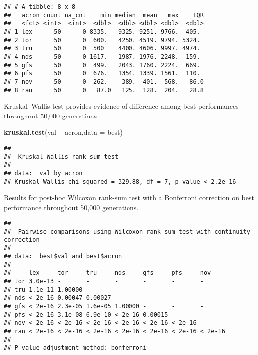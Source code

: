 \documentclass[]{book}
\newenvironment{Shaded}{\begin{snugshade}}{\end{snugshade}}
\newcommand{\DataTypeTok}[1]{\textcolor[rgb]{0.13,0.29,0.53}{#1}}
\newcommand{\KeywordTok}[1]{\textcolor[rgb]{0.13,0.29,0.53}{\textbf{#1}}}
\newcommand{\NormalTok}[1]{#1}
\newcommand{\OperatorTok}[1]{\textcolor[rgb]{0.81,0.36,0.00}{\textbf{#1}}}
\newcommand{\OtherTok}[1]{\textcolor[rgb]{0.56,0.35,0.01}{#1}}
\newcommand{\StringTok}[1]{\textcolor[rgb]{0.31,0.60,0.02}{#1}}
\begin{document}
\begin{verbatim}
## # A tibble: 8 x 8
##   acron count na_cnt    min median  mean   max    IQR
##   <fct> <int>  <int>  <dbl>  <dbl> <dbl> <dbl>  <dbl>
## 1 lex      50      0 8335.   9325. 9251. 9766.  405. 
## 2 tor      50      0  600.   4250. 4519. 9794. 5324. 
## 3 tru      50      0  500    4400. 4606. 9997. 4974. 
## 4 nds      50      0 1617.   1987. 1976. 2248.  159. 
## 5 gfs      50      0  499.   2043. 1760. 2224.  669. 
## 6 pfs      50      0  676.   1354. 1339. 1561.  110. 
## 7 nov      50      0  262.    389.  401.  568.   86.0
## 8 ran      50      0   87.0   125.  128.  204.   28.8
\end{verbatim}

Kruskal--Wallis test provides evidence of difference among best performances throughout 50,000 generations.

\begin{Shaded}
\begin{Highlighting}[]
\KeywordTok{kruskal.test}\NormalTok{(val }\OperatorTok{~}\StringTok{ }\NormalTok{acron,}\DataTypeTok{data =}\NormalTok{ best)}
\end{Highlighting}
\end{Shaded}

\begin{verbatim}
## 
##  Kruskal-Wallis rank sum test
## 
## data:  val by acron
## Kruskal-Wallis chi-squared = 329.88, df = 7, p-value < 2.2e-16
\end{verbatim}

Results for post-hoc Wilcoxon rank-sum test with a Bonferroni correction on best performance throughout 50,000 generations.

\begin{Shaded}
\end{Shaded}

\begin{verbatim}
## 
##  Pairwise comparisons using Wilcoxon rank sum test with continuity correction 
## 
## data:  best$val and best$acron 
## 
##     lex     tor     tru     nds     gfs     pfs     nov    
## tor 3.0e-13 -       -       -       -       -       -      
## tru 1.1e-11 1.00000 -       -       -       -       -      
## nds < 2e-16 0.00047 0.00027 -       -       -       -      
## gfs < 2e-16 2.3e-05 1.6e-05 1.00000 -       -       -      
## pfs < 2e-16 3.1e-08 6.9e-10 < 2e-16 0.00015 -       -      
## nov < 2e-16 < 2e-16 < 2e-16 < 2e-16 < 2e-16 < 2e-16 -      
## ran < 2e-16 < 2e-16 < 2e-16 < 2e-16 < 2e-16 < 2e-16 < 2e-16
## 
## P value adjustment method: bonferroni
\end{verbatim}
\end{document}
